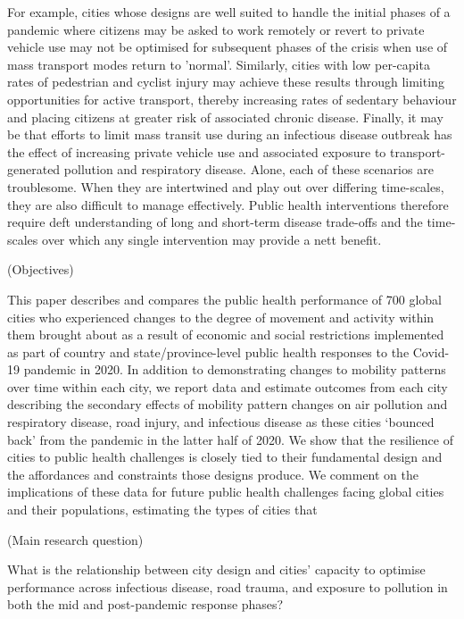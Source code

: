 \documentclass[preprint,12pt]{elsarticle}
\begin{document}
For example, cities whose designs are well suited to handle the initial phases of a pandemic where citizens may be asked to work remotely or revert to private vehicle use may not be optimised for subsequent phases of the crisis when use of mass transport modes return to 'normal'. Similarly, cities with low per-capita rates of pedestrian and cyclist injury may achieve these results through limiting opportunities for active transport, thereby increasing rates of sedentary behaviour and placing citizens at greater risk of associated chronic disease. Finally, it may be that efforts to limit mass transit use during an infectious disease outbreak has the effect of increasing private vehicle use and associated exposure to transport-generated pollution and respiratory disease. Alone, each of these scenarios are troublesome. When they are intertwined and play out over differing time-scales, they are also difficult to manage effectively. Public health interventions therefore require deft understanding of long and short-term disease trade-offs and the time-scales over which any single intervention may provide a nett benefit.


(Objectives)

This paper describes and compares the public health performance of 700 global cities who experienced changes to the degree of movement and activity within them brought about as a result of economic and social restrictions implemented as part of country and state/province-level public health responses to the Covid-19 pandemic in 2020. In addition to demonstrating changes to mobility patterns over time within each city, we report data and estimate outcomes from each city describing the secondary effects of mobility pattern changes on air pollution and respiratory disease, road injury, and infectious disease as these cities ‘bounced back’ from the pandemic in the latter half of 2020. We show that the resilience of cities to public health challenges is closely tied to their fundamental design and the affordances and constraints those designs produce. We comment on the implications of these data for future public health challenges facing global cities and their populations, estimating the types of cities that 

(Main research question)

What is the relationship between city design and cities’ capacity to optimise performance across infectious disease, road trauma, and exposure to pollution in both the mid and post-pandemic response phases?
\end{document}
